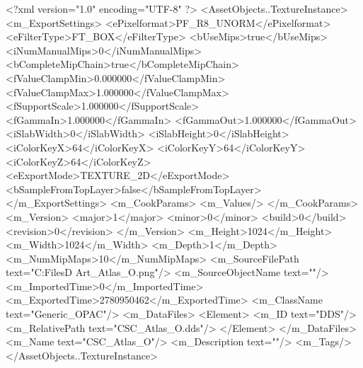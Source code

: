 <?xml version="1.0" encoding="UTF-8" ?>
<AssetObjects..TextureInstance>
	<m_ExportSettings>
		<ePixelformat>PF_R8_UNORM</ePixelformat>
		<eFilterType>FT_BOX</eFilterType>
		<bUseMips>true</bUseMips>
		<iNumManualMips>0</iNumManualMips>
		<bCompleteMipChain>true</bCompleteMipChain>
		<fValueClampMin>0.000000</fValueClampMin>
		<fValueClampMax>1.000000</fValueClampMax>
		<fSupportScale>1.000000</fSupportScale>
		<fGammaIn>1.000000</fGammaIn>
		<fGammaOut>1.000000</fGammaOut>
		<iSlabWidth>0</iSlabWidth>
		<iSlabHeight>0</iSlabHeight>
		<iColorKeyX>64</iColorKeyX>
		<iColorKeyY>64</iColorKeyY>
		<iColorKeyZ>64</iColorKeyZ>
		<eExportMode>TEXTURE_2D</eExportMode>
		<bSampleFromTopLayer>false</bSampleFromTopLayer>
	</m_ExportSettings>
	<m_CookParams>
		<m_Values/>
	</m_CookParams>
	<m_Version>
		<major>1</major>
		<minor>0</minor>
		<build>0</build>
		<revision>0</revision>
	</m_Version>
	<m_Height>1024</m_Height>
	<m_Width>1024</m_Width>
	<m_Depth>1</m_Depth>
	<m_NumMipMaps>10</m_NumMipMaps>
	<m_SourceFilePath text="C:\Users\Shadow\Desktop\Working Files\3D Art\Textures\CSC_Atlas_O.png"/>
	<m_SourceObjectName text=""/>
	<m_ImportedTime>0</m_ImportedTime>
	<m_ExportedTime>2780950462</m_ExportedTime>
	<m_ClassName text="Generic_OPAC"/>
	<m_DataFiles>
		<Element>
			<m_ID text="DDS"/>
			<m_RelativePath text="CSC_Atlas_O.dds"/>
		</Element>
	</m_DataFiles>
	<m_Name text="CSC_Atlas_O"/>
	<m_Description text=""/>
	<m_Tags/>
</AssetObjects..TextureInstance>

